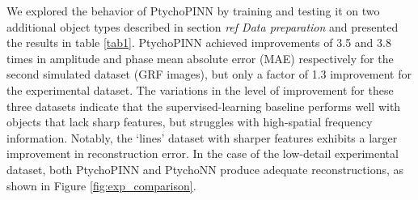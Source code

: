 \documentclass[sn-mathphys]{sn-jnl}%
\theoremstyle{thmstyleone}%
\theoremstyle{thmstyletwo}%
\theoremstyle{thmstylethree}%
\begin{document}

We explored the behavior of PtychoPINN by training and testing it on two additional object types described in section \emph{ref Data preparation} and presented the results in table \ref{tab1}. PtychoPINN achieved improvements of 3.5 and 3.8 times in amplitude and phase mean absolute error (MAE) respectively for the second simulated dataset (GRF images), but only a factor of 1.3 improvement for the experimental dataset. The variations in the level of improvement for these three datasets indicate that the supervised-learning baseline performs well with objects that lack sharp features, but struggles with high-spatial frequency information. Notably, the `lines' dataset with sharper features exhibits a larger improvement in reconstruction error. In the case of the low-detail experimental dataset, both PtychoPINN and PtychoNN produce adequate reconstructions, as shown in Figure \ref{fig:exp_comparison}.

\end{document}
